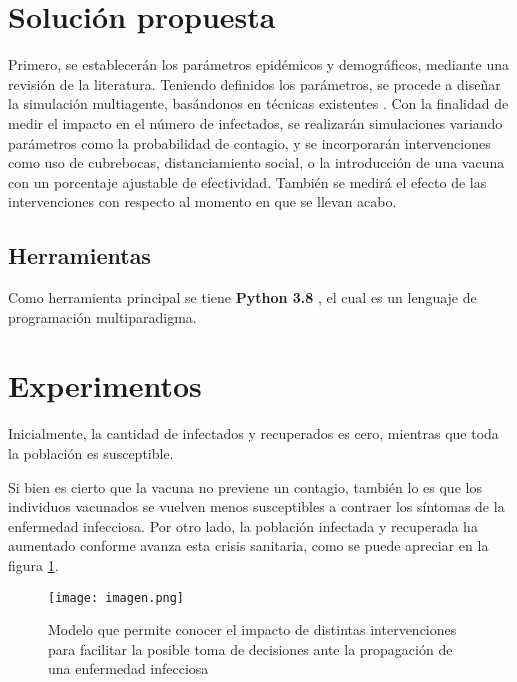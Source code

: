 \documentclass[a4]{sciposter}
\begin{document}
\begin{multicols}{2}
\section{Solución propuesta}

Primero, se establecerán los parámetros epidémicos y demográficos, mediante una revisión de la literatura. Teniendo definidos los parámetros, se procede a diseñar la simulación multiagente, basándonos en técnicas existentes \cite{transporte}. Con la finalidad de medir el impacto en el número de infectados, se realizarán simulaciones variando parámetros como la probabilidad
de contagio, y se incorporarán intervenciones como uso de cubrebocas, distanciamiento social, o la introducción de una vacuna con un porcentaje ajustable de efectividad. También se medirá el efecto de las intervenciones con respecto al momento en que se llevan acabo.

\subsection*{Herramientas}

Como herramienta principal se tiene \textbf{Python 3.8} \citep{python}, el cual es un lenguaje de programación multiparadigma.

\section{Experimentos}

Inicialmente, la cantidad de infectados y recuperados es cero, mientras que toda la población es susceptible.\par
Si bien es cierto que la vacuna no previene un contagio, también lo es que los individuos vacunados se vuelven menos susceptibles a contraer los síntomas de la enfermedad infecciosa. Por otro lado, la población infectada y recuperada ha aumentado conforme avanza esta crisis sanitaria, como se puede apreciar en la figura \ref{imagen}.

\begin{figure}[h]
\setcounter{figure}{1}
\captionsetup{type=figure}
\begin{center}
   \texttt{[image: imagen.png]}
   \end{center}
    \caption{Modelo que permite conocer el impacto de distintas intervenciones para facilitar la posible toma de decisiones ante la propagación de una enfermedad infecciosa}
    \label{imagen}
    \centering
\end{figure}


\end{multicols}
\end{document}
